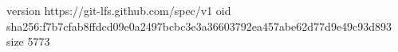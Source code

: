 version https://git-lfs.github.com/spec/v1
oid sha256:f7b7cfab8ffdcd09e0a2497bcbc3e3a36603792ea457abe62d77d9e49c93d893
size 5773
